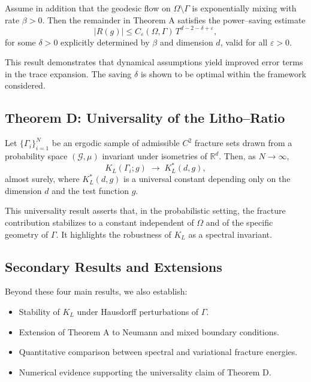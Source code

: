 \begin{theorem}
Assume in addition that the geodesic flow on $\Omega\setminus\Gamma$ is 
exponentially mixing with rate $\beta>0$. Then the remainder in Theorem A 
satisfies the power–saving estimate
\[
  |R(g)| \leq C_\varepsilon(\Omega,\Gamma)\,T^{d-2-\delta+\varepsilon},
\]
for some $\delta>0$ explicitly determined by $\beta$ and dimension $d$, 
valid for all $\varepsilon>0$.
\end{theorem}

This result demonstrates that dynamical assumptions yield improved error terms 
in the trace expansion. The saving $\delta$ is shown to be optimal within the 
framework considered.

\subsection{Theorem D: Universality of the Litho–Ratio}

\begin{theorem}[Universality of $K_L$]
Let $\{\Gamma_i\}_{i=1}^N$ be an ergodic sample of admissible $C^2$ fracture 
sets drawn from a probability space $(\mathcal G,\mu)$ invariant under 
isometries of $\mathbb R^d$. Then, as $N\to\infty$,
\[
  K_L(\Gamma_i;g) \;\longrightarrow\; K_L^*(d,g),
\]
almost surely, where $K_L^*(d,g)$ is a universal constant depending only on 
the dimension $d$ and the test function $g$.
\end{theorem}

This universality result asserts that, in the probabilistic setting, the 
fracture contribution stabilizes to a constant independent of $\Omega$ and 
of the specific geometry of $\Gamma$. It highlights the robustness of 
$K_L$ as a spectral invariant.

\subsection{Secondary Results and Extensions}

Beyond these four main results, we also establish:

\begin{itemize}
  \item Stability of $K_L$ under Hausdorff perturbations of $\Gamma$.
  \item Extension of Theorem A to Neumann and mixed boundary conditions.
  \item Quantitative comparison between spectral and variational fracture 
  energies.
  \item Numerical evidence supporting the universality claim of Theorem D.
\end{itemize}

